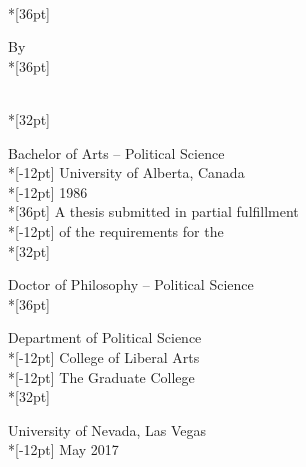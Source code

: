 \thispagestyle{empty}%

\begin{center}
 \TitleName\\*[36pt]

\normalsize By\\*[36pt]

 \AuthorName\\*[32pt] 

 Bachelor of Arts -- Political Science\\*[-12pt] 
 University of Alberta, Canada\\*[-12pt]
 1986\\*[36pt]
 A thesis submitted in partial fulfillment\\*[-12pt]
 of the requirements for the\\*[32pt]

 Doctor of Philosophy -- Political Science\\*[36pt]
 
 Department of Political Science\\*[-12pt]
 College of Liberal Arts \\*[-12pt]
 The Graduate College\\*[32pt]

 University of Nevada, Las Vegas\\*[-12pt]
 May 2017
\end{center}
